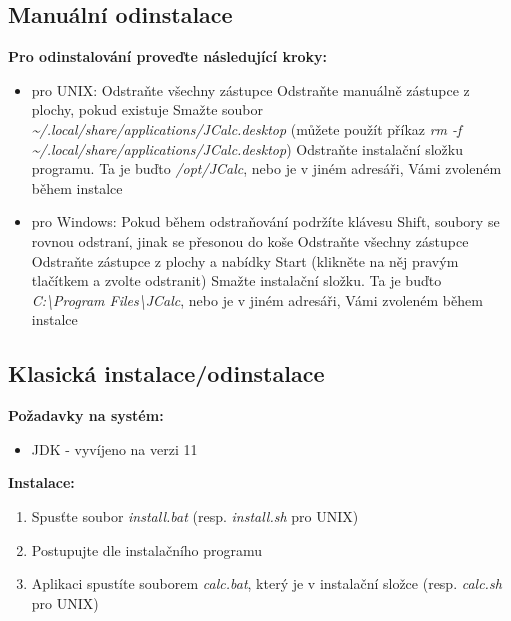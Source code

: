 \documentclass[a4paper, 11pt]{article}
\begin{document}
\subsection{Manuální odinstalace}

\textbf{Pro odinstalování proveďte následující kroky:}

\begin{itemize}
	\item pro UNIX:
		\subitem Odstraňte všechny zástupce
			\subsubitem Odstraňte manuálně zástupce z plochy, pokud existuje
			\subsubitem Smažte soubor \emph{\textasciitilde/.local/share/applications/JCalc.desktop}
			\subsubitem (můžete použít příkaz \emph{rm -f \textasciitilde/.local/share/applications/JCalc.desktop})
		\subitem Odstraňte instalační složku programu. Ta je buďto \emph{/opt/JCalc}, nebo je v jiném adresáři, Vámi zvoleném během instalce

	\item pro Windows:
		\subitem Pokud během odstraňování podržíte klávesu Shift, soubory se rovnou odstraní, jinak se přesonou do koše
		\subitem Odstraňte všechny zástupce
			\subsubitem Odstraňte zástupce z plochy a nabídky Start (klikněte na něj pravým tlačítkem a zvolte odstranit)
		\subitem Smažte instalační složku. Ta je buďto \emph{C:\textbackslash Program Files\textbackslash JCalc}, nebo je v jiném adresáři, Vámi zvoleném během instalce
\end{itemize}

\subsection{Klasická instalace/odinstalace}

\textbf{Požadavky na systém:}

\begin{itemize}
    \item JDK - vyvíjeno na verzi 11
\end{itemize}

\noindent
\textbf{Instalace:}

\begin{enumerate}
    \item Spusťte soubor \emph{install.bat} (resp. \emph{install.sh} pro UNIX)
    \item Postupujte dle instalačního programu
    \item Aplikaci spustíte souborem \emph{calc.bat}, který je v instalační složce (resp. \emph{calc.sh} pro UNIX)
\end{enumerate}
\end{document}

